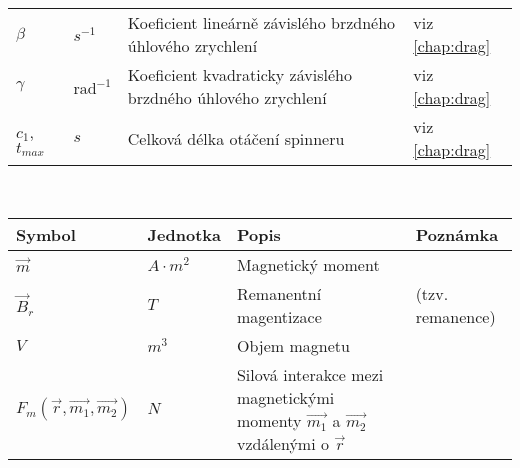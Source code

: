 \documentclass[12pt, a4paper,
 twoside,        %
 openright
]{report}
\begin{document}
\begin{table}[!ht]
\begin{tabularx}{\textwidth}{m{} m{} p{} p{5cm} }
        $\beta$          & $s^{-1}$                  & Koeficient lineárně závislého brzdného úhlového zrychlení     & viz \ref{chap:drag}                                     \\
        $\gamma$         & $\text{rad}^{-1}$         & Koeficient kvadraticky závislého brzdného úhlového zrychlení  & viz \ref{chap:drag}                                     \\
        $c_1$, $t_{max}$ & $s$                       & Celková délka otáčení spinneru                                & viz \ref{chap:drag}                                     \\
    \end{tabularx}

    \vspace{24pt}

     \\
    \begin{tabularx}{\textwidth}{m{} m{} p{} p{4cm} }
        \textbf{Symbol}                      & \textbf{Jednotka}                                                            & \textbf{Popis}                                                                              & \textbf{Poznámka}                      \\
        \hline
        $\vec{m}$                            & $A \cdot m^2$                                                                & Magnetický moment                                                                                                                    \\
        $\vec{B}_r$                          & $T$                                                                          & Remanentní magentizace                                                                      & (tzv. remanence)                       \\
        $V$                                  & $m^3$                                                                        & Objem magnetu                                                                                                                        \\
        $F_m(\vec{r}, \vec{m_1}, \vec{m_2})$ & $N$                                                                          & Silová interakce mezi magnetickými momenty $\vec{m_1}$ a $\vec{m_2}$ vzdálenými o $\vec{r}$ & \cite{magnetic_force}                  \\

\end{tabularx}
\end{table}
\end{document}
